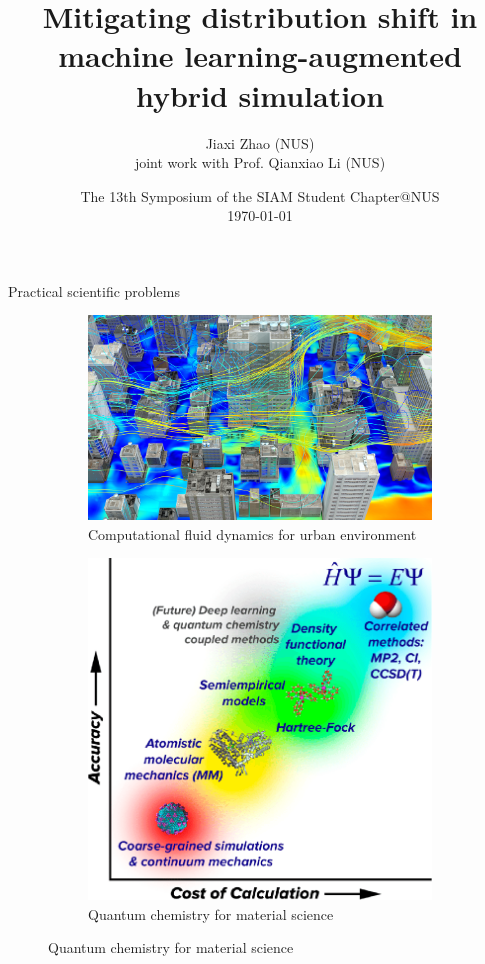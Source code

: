\documentclass[paper slide]{beamer}
\title[Mitigating DS in SciML]{Mitigating distribution shift in machine learning-augmented hybrid simulation\footnotemark}
\author[J. Zhao]{Jiaxi Zhao (NUS) \\ \small joint work with Prof. Qianxiao Li (NUS)}
\date[\today]{The 13th Symposium of the SIAM Student Chapter@NUS \\ \today}
\begin{document}
\par \setlength{\parindent}{2em}

\begin{frame}
\titlepage
{}
\end{frame}


\begin{frame}{Practical scientific problems}
	\begin{figure}[ht]
		\centering
		\begin{subfigure}{0.5\linewidth} %
			\centering
			\includegraphics[width=\linewidth]{fig/urban_environment.jpeg}
			\caption{Computational fluid dynamics for urban environment}
		  \end{subfigure}%
		  \begin{subfigure}{0.5\linewidth} %
			\centering
			\includegraphics[width=\linewidth]{fig/quantum_chemisty.png}
			\caption{Quantum chemistry for material science}
		  \end{subfigure}
	\end{figure}
\end{frame}
\end{document}
